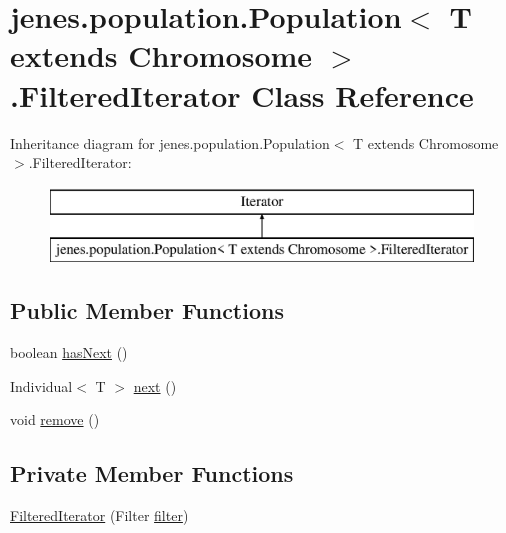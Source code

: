 \hypertarget{classjenes_1_1population_1_1_population_3_01_t_01extends_01_chromosome_01_4_1_1_filtered_iterator}{\section{jenes.\-population.\-Population$<$ T extends Chromosome $>$.Filtered\-Iterator Class Reference}
\label{classjenes_1_1population_1_1_population_3_01_t_01extends_01_chromosome_01_4_1_1_filtered_iterator}
}
Inheritance diagram for jenes.\-population.\-Population$<$ T extends Chromosome $>$.Filtered\-Iterator\-:\begin{figure}[H]
\begin{center}
\leavevmode
\includegraphics[height=2.000000cm]{classjenes_1_1population_1_1_population_3_01_t_01extends_01_chromosome_01_4_1_1_filtered_iterator}
\end{center}
\end{figure}
\subsection*{Public Member Functions}
\begin{DoxyCompactItemize}
\item 
boolean \hyperlink{classjenes_1_1population_1_1_population_3_01_t_01extends_01_chromosome_01_4_1_1_filtered_iterator_a1ea69c48981548165c44bd9ad6f4e0ed}{has\-Next} ()
\item 
Individual$<$ T $>$ \hyperlink{classjenes_1_1population_1_1_population_3_01_t_01extends_01_chromosome_01_4_1_1_filtered_iterator_a71c24a5023497cd0cd5da31555b38bcf}{next} ()
\item 
void \hyperlink{classjenes_1_1population_1_1_population_3_01_t_01extends_01_chromosome_01_4_1_1_filtered_iterator_ae8881c2033101c07380874500b11975a}{remove} ()
\end{DoxyCompactItemize}
\subsection*{Private Member Functions}
\begin{DoxyCompactItemize}
\item 
\hyperlink{classjenes_1_1population_1_1_population_3_01_t_01extends_01_chromosome_01_4_1_1_filtered_iterator_a915b63ed1288f4d18cc0dd85f5494b40}{Filtered\-Iterator} (Filter \hyperlink{classjenes_1_1population_1_1_population_3_01_t_01extends_01_chromosome_01_4_1_1_filtered_iterator_a620ba1ca9591ae9b3268066c4c3eadc7}{filter})
\end{DoxyCompactItemize}
